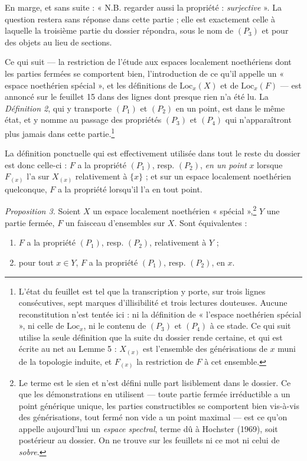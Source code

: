 \documentclass[11pt,a4paper]{article}
\begin{document}
En marge, et sans suite : « N.B. regarder aussi la propriété :
\emph{surjective} ». La question restera sans réponse dans cette partie ; elle
est exactement celle à laquelle la troisième partie du dossier répondra, sous le
nom de $(P_{3})$ et pour des objets au lieu de sections.

Ce qui suit — la restriction de l'étude aux espaces localement noethériens dont
les parties fermées se comportent bien, l'introduction de ce qu'il appelle un
« espace noethérien spécial », et les définitions de $\mathrm{Loc}_{x}(X)$ et de
$\mathrm{Loc}_{x}(F)$ — est annoncé sur le feuillet 15 dans des lignes dont
presque rien n'a été lu. La \emph{Définition 2}, qui y transporte $(P_{1})$ et
$(P_{2})$ en un point, est dans le même état, et y nomme au passage des
propriétés $(P_{3})$ et $(P_{4})$ qui n'apparaîtront plus jamais dans cette
partie.\footnote{L'état du feuillet est tel que la transcription y porte, sur
trois lignes consécutives, sept marques d'illisibilité et trois lectures
douteuses. Aucune reconstitution n'est tentée ici : ni la définition de
« l'espace noethérien spécial », ni celle de $\mathrm{Loc}_{x}$, ni le contenu
de $(P_{3})$ et $(P_{4})$ à ce stade. Ce qui suit utilise la seule définition
que la suite du dossier rende certaine, et qui est écrite au net au Lemme 5 :
$X_{(x)}$ est l'ensemble des générisations de $x$ muni de la topologie induite,
et $F_{(x)}$ la restriction de $F$ à cet ensemble.}

La définition ponctuelle qui est effectivement utilisée dans tout le reste du
dossier est donc celle-ci : $F$ a la propriété $(P_{1})$, resp. $(P_{2})$,
\emph{en un point} $x$ lorsque $F_{(x)}$ l'a sur $X_{(x)}$ relativement à
$\{x\}$ ; et sur un espace localement noethérien quelconque, $F$ a la propriété
lorsqu'il l'a en tout point.

\emph{Proposition 3.} Soient $X$ un espace localement noethérien
« spécial »,\footnote{Le terme est le sien et n'est défini nulle part
lisiblement dans le dossier. Ce que les démonstrations en utilisent — toute
partie fermée irréductible a un point générique unique, les parties
constructibles se comportent bien vis-à-vis des générisations, tout fermé non
vide a un point maximal — est ce qu'on appelle aujourd'hui un \emph{espace
spectral}, terme dû à Hochster (1969), soit postérieur au dossier. On ne trouve
sur les feuillets ni ce mot ni celui de \emph{sobre}.} $Y$ une partie fermée,
$F$ un faisceau d'ensembles sur $X$. Sont équivalentes :
\begin{enumerate}
  \item[(i)] $F$ a la propriété $(P_{1})$, resp. $(P_{2})$, relativement à $Y$ ;
  \item[(ii)] pour tout $x \in Y$, $F$ a la propriété $(P_{1})$, resp.
  $(P_{2})$, en $x$.
\end{enumerate}
\end{document}
